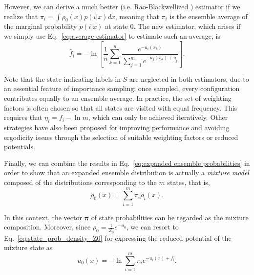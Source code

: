 \documentclass[journal=jctcce,manuscript=article]{achemso}
\newcommand{\vt}[1]{\boldsymbol{\mathbf{#1}}}   %
\begin{document}
However, we can derive a much better (i.e. Rao-Blackwellized \cite{Carlson_2016, Ding_2017}) estimator if we realize that $\pi_i = \int \rho_0(x) p(i|x) dx$, meaning that $\pi_i$ is the ensemble average of the marginal probability $p(i|x)$ at state $0$. The new estimator, which arises if we simply use Eq.~\eqref{eq:average estimator} to estimate such an average, is
\begin{equation}
\label{eq:expanded ensemble FEP estimator}
\hat f_i = -\ln \left[ \frac{1}{n}\sum_{k=1}^n \frac{e^{-u_i(x_k)}}{\sum_{j=1}^m e^{-u_j(x_k) + \eta_j}} \right].
\end{equation}

Note that the state-indicating labels in $S$ are neglected in both estimators, due to an essential feature of importance sampling: once sampled, every configuration contributes equally to an ensemble average. In practice, the set of weighting factors is often chosen so that all states are visited with equal frequency. This requires that $\eta_i = f_i - \ln m$, which can only be achieved iteratively. Other strategies have also been proposed\cite{Katzgraber_2006, Trebst_2006, Escobedo_2007, Escobedo_2008, Martinez-veracoechea_2008} for improving performance and avoiding ergodicity issues through the selection of suitable weighting factors or reduced potentials.

Finally, we can combine the results in Eq.~\eqref{eq:expanded ensemble probabilities} in order to show that an expanded ensemble distribution is actually a \textit{mixture model} \cite{Lindsay_1995, Marin_2005} composed of the distributions corresponding to the $m$ states, that is,
\begin{equation}
\label{eq:mixture ensemble}
\rho_0(x) = \sum_{i=1}^m \pi_i \rho_i(x).
\end{equation}

In this context, the vector $\vt \pi$ of state probabilities can be regarded as the mixture composition. Moreover, since $\rho_0 = \frac{1}{Z_0}e^{-u_0}$, we can resort to Eq.~\eqref{eq:state_prob_density_Z0} for expressing the reduced potential of the mixture state as
\begin{equation}
\label{eq:mixture potential}
u_0(x) = -\ln \sum_{i=1}^m \pi_i e^{-u_i(x) + f_i}.
\end{equation}
\end{document}
